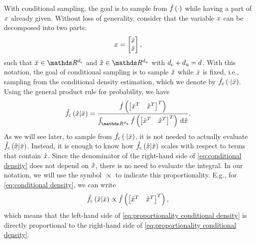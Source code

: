 With conditional sampling, the goal is to sample from $\hat{f}\left( \cdot \right)$ while having a part of $x$ already given. 
Without loss of generality, consider that the variable $x$ can be decomposed into two parts:
\begin{equation}
	\label{eq:decomposition}
	x = \begin{bmatrix}
		\bar{x} \\ \hat{x}
	\end{bmatrix},
\end{equation}
such that $\variableparta \in \realnumbers^{\dimensionparta}$ and $\variablepartb \in \realnumbers^{\dimensionpartb}$ with $d_\mathrm{c} + d_\mathrm{u} = d$.
With this notation, the goal of conditional sampling is to sample $\hat{x}$ while $\bar{x}$ is fixed, i.e., sampling from the conditional density estimation, \cstarta which we denote by $\hat{f}_{\mathrm{c}}\left( \cdot | \bar{x} \right)$.
Using the general product rule for probability, we have
\begin{equation}
	\label{eq:conditional density}
	\densityestcond{\variablepartb}{\variableparta}
	= \frac{\densityest{\begin{bmatrix}\variableparta^T & \variablepartb^T \end{bmatrix}^T}}
	{\int_{\realnumbers^{\dimensionpartb}} \densityest{\begin{bmatrix}\variableparta^T & \variablepartb^T \end{bmatrix}^T} \ud \variablepartb}.
\end{equation}
As we will see later, to sample from $\hat{f}_{\mathrm{c}}\left( \cdot | \bar{x} \right)$, it is not needed to actually evaluate $\hat{f}_{\mathrm{c}}\left( \hat{x} | \bar{x} \right)$.
Instead, it is enough to know how $\hat{f}_{\mathrm{c}}\left( \hat{x} | \bar{x} \right)$ scales with respect to terms that contain $\hat{x}$.
Since the denominator of the right-hand side of \cref{eq:conditional density} does not depend on $\hat{x}$, there is no need to evaluate the integral.
In our notation, we will use the symbol $\propto$ to indicate this proportionality.
E.g., for \cref{eq:conditional density}, we can write
\begin{equation}
	\label{eq:proportionality conditional density}
	\hat{f}_{\mathrm{c}}\left( \hat{x} | \bar{x} \right)
	\propto \hat{f}\left( \begin{bmatrix}\bar{x}^T & \hat{x}^T \end{bmatrix}^T \right),
\end{equation}
which means that the left-hand side of \cref{eq:proportionality conditional density} is directly proportional to the right-hand side of \cref{eq:proportionality conditional density}.
\cenda

